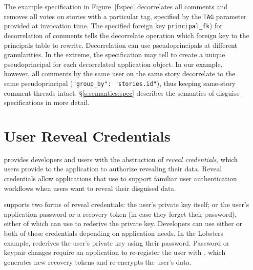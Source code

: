 The example specification in Figure~\ref{f:spec} decorrelates all comments and
removes all votes on stories with a particular tag, specified by the
\texttt{TAG} parameter provided at invocation time.  The specified foreign key
\texttt{principal\_fk}) for decorrelation of comments tells the decorrelate
operation which foreign key to the principals table to rewrite. 
%
Decorrelation can use pseudoprincipals at different granularities.  In the
extreme, the \xx specification may tell \sys to create a unique pseudoprincipal
for each decorrelated application object.  In our example, however, all comments
by the same user on the same story decorrelate to the same pseudoprincipal
(\verb+"group_by": "stories.id"+), thus keeping same-story comment threads
intact.
%
\S\ref{s:semantics:spec} describes the semantics of disguise specifications in more
detail.
%
%

\section{User Reveal Credentials}
\sys provides developers and users with the abstraction of \emph{reveal
credentials}, which users provide to the application to authorize revealing
their data.
%
Reveal credentials allow applications that use \sys to support familiar user
authentication workflows when users want to reveal their disguised data. 
%

%
\sys supports two forms of reveal credentials: \one{} the user's private key
itself; or \two{} the user's application password or a recovery token (in case
they forget their password), either of which \sys can use to rederive the
private key.
%
Developers can use either or both of these credentials depending on application needs.
%
In the Lobsters example, \sys rederives the user's private key using their password.
%
%
%
Password or keypair changes require an application to re-register the user with
\sys, which generates new recovery tokens and re-encrypts the user's \xxed data.
%
%
%
%

